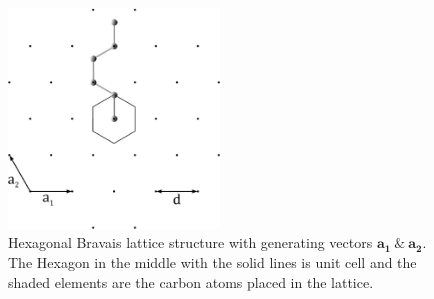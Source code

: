\begin{figure}
  \centering
  \includegraphics[width=0.5\textwidth]{Figures/hexagon2.eps}
  \caption{Hexagonal Bravais lattice structure with generating vectors $\mathbf{a_{1}} \ \& \ \mathbf{a_{2}}$. The Hexagon in the middle with the solid lines is unit cell and the shaded elements are the carbon atoms placed in the lattice.}
  \label{hexagon}
\end{figure}
